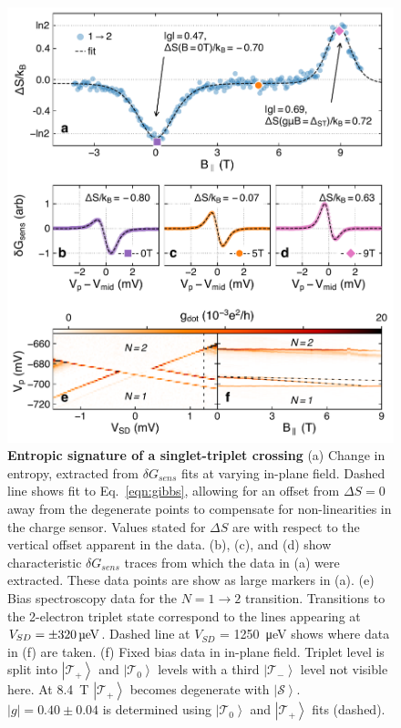 \documentclass[twocolumn,showpacs,amsmath,amssymb,prl,aps,superscriptaddress]{revtex4-1}
\newcommand{\ket}[1]{\ensuremath{\left|#1\right\rangle}}
\begin{document}
\begin{figure}
        \includegraphics[width=1.0\columnwidth]{../figures/figure_4.pdf}
        \caption{\label{fig:fig4}  \textbf{Entropic signature of a singlet-triplet crossing} (a) Change in entropy, extracted from $\delta G_{sens}$ fits at varying in-plane field. Dashed line shows fit to Eq.~\ref{eqn:gibbs}, allowing for an offset from $\Delta S=0$ away from the degenerate points to compensate for non-linearities in the charge sensor. Values stated for $\Delta S$ are with respect to the vertical offset apparent in the data. (b), (c), and (d) show characteristic $\delta G_{sens}$ traces from which the data in (a) were extracted. These data points are show as large markers in (a). (e) Bias spectroscopy data for the $N=1 \rightarrow 2$ transition. Transitions to the 2-electron triplet state correspond to the lines appearing at $V_{SD} = \SI{\pm 320}{\micro\electronvolt}$. Dashed line at $V_{SD}$ = \SI{1250}{\micro\electronvolt} shows where data in (f) are taken. (f) Fixed bias data in in-plane field. Triplet level is split into $\ket{\mathcal{T_+}}$ and $\ket{\mathcal{T_0}}$ levels with a third $\ket{\mathcal{T_-}}$ level not visible here. At \SI{8.4}{\tesla} $\ket{\mathcal{T_+}}$ becomes degenerate with $\ket{\mathcal{S}}$. $|g|=0.40\pm0.04$ is determined using $\ket{\mathcal{T_0}}$ and $\ket{\mathcal{T_+}}$ fits (dashed).}
\end{figure}
\end{document}
